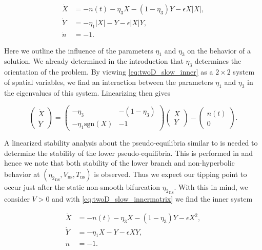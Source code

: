 \begin{equation}\label{eq:twoD_slow_inner}
\begin{aligned}
  \dot{X} & = -n(t)-\eta_3 X-(1-\eta_3)Y-\epsilon X|X|, \\
  \dot{Y} & = -\eta_1 |X|-Y-\epsilon |X|Y, \\
 \dot{n} & = -1.
 \end{aligned}
\end{equation}

Here we outline the influence of the parameters $\eta_1$ and $\eta_3$ on the behavior of a solution. We already determined in the introduction that $\eta_3$ determines the orientation of the problem. By viewing \eqref{eq:twoD_slow_inner} as a $2\times 2$ system of spatial variables, we find an interaction between the parameters $\eta_1$ and $\eta_3$ in the eigenvalues of this system. Linearizing then gives

\begin{equation}\label{eq:twoD_slow_innermatrix}
\begin{pmatrix}
\dot{X}\\
\dot{Y}
\end{pmatrix}=
\begin{pmatrix}
-\eta_3 & -(1-\eta_3) \\ 
-\eta_1\text{sgn}(X) & -1
\end{pmatrix}
\begin{pmatrix}
X\\
Y
\end{pmatrix}-
\begin{pmatrix}
n(t)\\
0
\end{pmatrix}.
\end{equation}

\indent A linearized stability analysis about the pseudo-equilibria similar to \cite{seydel2009practical} is needed to determine the stability of the lower pseudo-equilibria. This is performed in \cite{dijkstra2013nonlinear} and hence we note that both stability of the lower branch and non-hyperbolic behavior at $({\eta_2}_{\text{ns}},V_{\text{ns}},T_{\text{ns}})$ is observed. Thus we expect our tipping point to occur just after the static non-smooth bifurcation ${\eta_2}_{\text{ns}}$. With this in mind, we consider $V>0$ and with \eqref{eq:twoD_slow_innermatrix} we find the inner system

\begin{equation}\label{eq:twoD_slow_positiveinner}
 \begin{aligned}
  \dot{X} & = -n(t)-\eta_3 X-(1-\eta_3)Y-\epsilon X^2, \\
  \dot{Y} & = -\eta_1 X-Y-\epsilon XY, \\
 \dot{n} & = -1.
 \end{aligned}
\end{equation}

